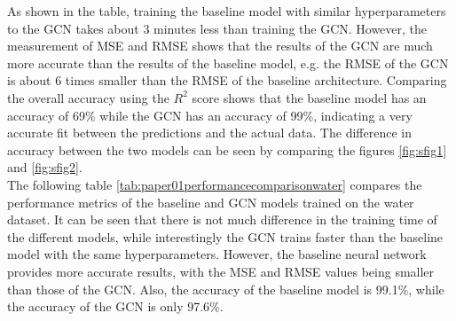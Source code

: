 As shown in the table, training the baseline model with similar hyperparameters to the GCN takes about 3 minutes less than training the GCN. However, the measurement of MSE and RMSE shows that the results of the GCN are much more accurate than the results of the baseline model, e.g. the RMSE of the GCN is about 6 times smaller than the RMSE of the baseline architecture. Comparing the overall accuracy using the $R^2$ score shows that the baseline model has an accuracy of 69\% while the GCN has an accuracy of 99\%, indicating a very accurate fit between the predictions and the actual data. The difference in accuracy between the two models can be seen by comparing the figures \ref{fig:sfig1} and \ref{fig:sfig2}.\\

The following table \ref{tab:paper01performancecomparisonwater} compares the performance metrics of the baseline and GCN models trained on the water dataset. It can be seen that there is not much difference in the training time of the different models, while interestingly the GCN trains faster than the baseline model with the same hyperparameters. However, the baseline neural network provides more accurate results, with the MSE and RMSE values being smaller than those of the GCN. Also, the accuracy of the baseline model is 99.1\%, while the accuracy of the GCN is only 97.6\%.

\begin{table}[h]
    \centering
    \captionsetup{justification=centering}
       \caption[Comparison of performance metrics of the developed model (water dataset)]{\label{tab:paper01performancecomparisonwater} Comparison of performance metrics of the developed model [water dataset]}
\end{table}

